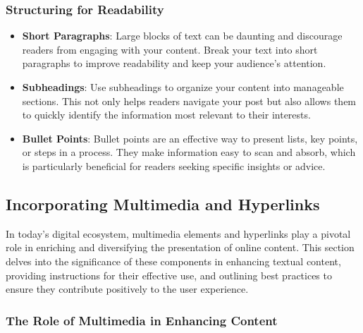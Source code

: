 \documentclass[
]{book}
\begin{document}
\hypertarget{structuring-for-readability}{%
\subsubsection{Structuring for Readability}\label{structuring-for-readability}}

\begin{itemize}
\item
  \textbf{Short Paragraphs}: Large blocks of text can be daunting and discourage readers from engaging with your content. Break your text into short paragraphs to improve readability and keep your audience's attention.
\item
  \textbf{Subheadings}: Use subheadings to organize your content into manageable sections. This not only helps readers navigate your post but also allows them to quickly identify the information most relevant to their interests.
\item
  \textbf{Bullet Points}: Bullet points are an effective way to present lists, key points, or steps in a process. They make information easy to scan and absorb, which is particularly beneficial for readers seeking specific insights or advice.
\end{itemize}

\hypertarget{incorporating-multimedia-and-hyperlinks}{%
\subsection*{Incorporating Multimedia and Hyperlinks}\label{incorporating-multimedia-and-hyperlinks}}

In today's digital ecosystem, multimedia elements and hyperlinks play a pivotal role in enriching and diversifying the presentation of online content. This section delves into the significance of these components in enhancing textual content, providing instructions for their effective use, and outlining best practices to ensure they contribute positively to the user experience.

\hypertarget{the-role-of-multimedia-in-enhancing-content}{%
\subsubsection{The Role of Multimedia in Enhancing Content}\label{the-role-of-multimedia-in-enhancing-content}}
\end{document}
